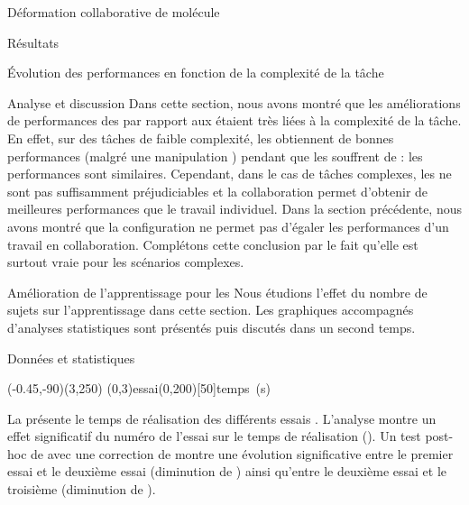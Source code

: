 \documentclass[myfrancais,ngerman,english,french]{mythesis}
\begin{document}
\begin{mychapter}{Déformation collaborative de molécule}
\begin{mysection}{Résultats}
\begin{mysubsection}{Évolution des performances en fonction de la complexité de la tâche}
\begin{mysubsubsection}{Analyse et discussion}
					Dans cette section, nous avons montré que les améliorations de performances des  par rapport aux  étaient très liées à la complexité de la tâche.
					En effet, sur des tâches de faible complexité, les  obtiennent de bonnes performances (malgré une manipulation ) pendant que les  souffrent de  : les performances sont similaires.
					Cependant, dans le cas de tâches complexes, les  ne sont pas suffisamment préjudiciables et la collaboration permet d'obtenir de meilleures performances que le travail individuel.
					Dans la section précédente, nous avons montré que la configuration  ne permet pas d'égaler les performances d'un travail en collaboration.
					Complétons cette conclusion par le fait qu'elle est surtout vraie pour les scénarios complexes.
				\end{mysubsubsection}
			\end{mysubsection}
			\begin{mysubsection}{Amélioration de l'apprentissage pour les }
				Nous étudions l'effet du nombre de sujets sur l'apprentissage dans cette section.
				Les graphiques accompagnés d'analyses statistiques sont présentés puis discutés dans un second temps.
				\begin{mysubsubsection}{Données et statistiques}
					\begin{myfigure}
						\begin{myps}(-0.45,-90)(3,250)
							\myaxes(0,3){essai}(0,200)[50]{temps~(s)}
						\end{myps}
					\end{myfigure}

					La  présente le temps de réalisation  des différents essais .
					L'analyse montre un effet significatif du numéro de l'essai  sur le temps de réalisation  ().
					Un test post-hoc de  avec une correction de  montre une évolution significative entre le premier essai et le deuxième essai (diminution de ) ainsi qu'entre le deuxième essai et le troisième (diminution de ).


\end{mysubsubsection}
\end{mysubsection}
\end{mysection}
\end{mychapter}
\end{document}
